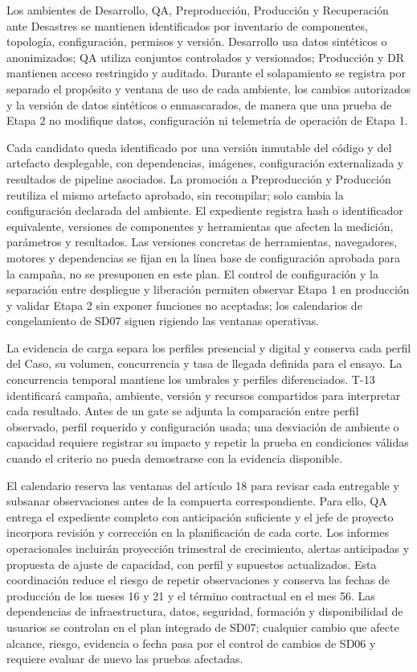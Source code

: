 \documentclass[11pt]{article}
\begin{document}
Los ambientes de Desarrollo, QA, Preproducción, Producción y Recuperación ante Desastres se mantienen identificados por inventario de componentes, topología, configuración, permisos y versión. Desarrollo usa datos sintéticos o anonimizados; QA utiliza conjuntos controlados y versionados; Producción y DR mantienen acceso restringido y auditado. Durante el solapamiento se registra por separado el propósito y ventana de uso de cada ambiente, los cambios autorizados y la versión de datos sintéticos o enmascarados, de manera que una prueba de Etapa 2 no modifique datos, configuración ni telemetría de operación de Etapa 1.

Cada candidato queda identificado por una versión inmutable del código y del artefacto desplegable, con dependencias, imágenes, configuración externalizada y resultados de pipeline asociados. La promoción a Preproducción y Producción reutiliza el mismo artefacto aprobado, sin recompilar; solo cambia la configuración declarada del ambiente. El expediente registra hash o identificador equivalente, versiones de componentes y herramientas que afecten la medición, parámetros y resultados. Las versiones concretas de herramientas, navegadores, motores y dependencias se fijan en la línea base de configuración aprobada para la campaña, no se presuponen en este plan. El control de configuración y la separación entre despliegue y liberación permiten observar Etapa 1 en producción y validar Etapa 2 sin exponer funciones no aceptadas; los calendarios de congelamiento de SD07 siguen rigiendo las ventanas operativas.

La evidencia de carga separa los perfiles presencial y digital y conserva cada perfil del Caso, su volumen, concurrencia y tasa de llegada definida para el ensayo. La concurrencia temporal mantiene los umbrales y perfiles diferenciados. T-13 identificará campaña, ambiente, versión y recursos compartidos para interpretar cada resultado. Antes de un gate se adjunta la comparación entre perfil observado, perfil requerido y configuración usada; una desviación de ambiente o capacidad requiere registrar su impacto y repetir la prueba en condiciones válidas cuando el criterio no pueda demostrarse con la evidencia disponible.

El calendario reserva las ventanas del artículo 18 para revisar cada entregable y subsanar observaciones antes de la compuerta correspondiente. Para ello, QA entrega el expediente completo con anticipación suficiente y el jefe de proyecto incorpora revisión y corrección en la planificación de cada corte. Los informes operacionales incluirán proyección trimestral de crecimiento, alertas anticipadas y propuesta de ajuste de capacidad, con perfil y supuestos actualizados. Esta coordinación reduce el riesgo de repetir observaciones y conserva las fechas de producción de los meses 16 y 21 y el término contractual en el mes 56. Las dependencias de infraestructura, datos, seguridad, formación y disponibilidad de usuarios se controlan en el plan integrado de SD07; cualquier cambio que afecte alcance, riesgo, evidencia o fecha pasa por el control de cambios de SD06 y requiere evaluar de nuevo las pruebas afectadas.
\end{document}
